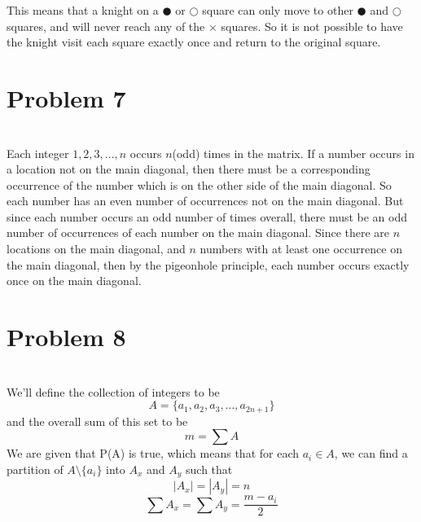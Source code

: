 \documentclass[12pt]{article}
\begin{document}
This means that a knight on a $\CIRCLE$ or $\Circle$ square can only move to other $\CIRCLE$ and $\Circle$ squares, and will never reach any of the $\times$ squares. So it is not possible to have the knight visit each square exactly once and return to the original square.


\section*{Problem 7}
\\

Each integer $1,2,3,\dots,n$ occurs $n$(odd) times in the matrix. If a number occurs in a location not on the main diagonal, then there must be a corresponding occurrence of the number which is on the other side of the main diagonal. So each number has an even number of occurrences not on the main diagonal. But since each number occurs an odd number of times overall, there must be an odd number of occurrences of each number on the main diagonal. Since there are $n$ locations on the main diagonal, and $n$ numbers with at least one occurrence on the main diagonal, then by the pigeonhole principle, each number occurs exactly once on the main diagonal.


\newpage
\section*{Problem 8}
\\

We'll define the collection of integers to be
\[A=\{a_1, a_2, a_3, \dots, a_{2n+1}\}\]
and the overall sum of this set to be
\[m = \sum A\]
We are given that P(A) is true, which means that for each $a_i \in A$, we can find a partition of $A\setminus\{a_i\}$ into $A_x$ and $A_y$ such that
\begin{equation} \label{size}
    |A_x| = |A_y| = n
\end{equation}
\begin{equation} \label{sum}
    \sum A_x = \sum A_y = \frac{m - a_i}{2}
\end{equation}
\end{document}
